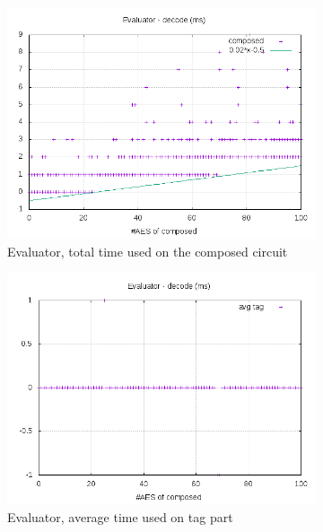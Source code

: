 \documentclass[10pt,a4paper]{article}
\begin{document}
\begin{figure}[h]
    \begin{subfigure}[t]{0.3\textwidth}
        \includegraphics[width=\textwidth]{eval_decode_plots}
        \caption{Evaluator,  total time used on the composed circuit}
    \end{subfigure}
    \begin{subfigure}[t]{0.3\textwidth}
        \includegraphics[width=\textwidth]{eval_decode_avg}
        \caption{Evaluator, average time used on tag part}
    \end{subfigure}
    \begin{subfigure}[t]{0.3\textwidth}

\end{subfigure}
\end{figure}
\end{document}
